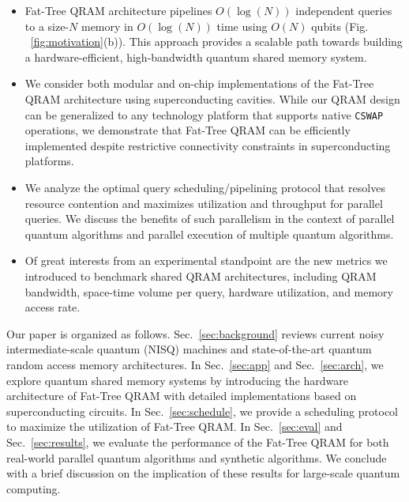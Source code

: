 \begin{itemize}
    \item Fat-Tree QRAM architecture pipelines $O(\log(N))$ independent queries to a size-$N$ memory in $O(\log(N))$ time using $O(N)$ qubits (Fig. ~\ref{fig:motivation}(b)). This approach provides a scalable path towards building a hardware-efficient, high-bandwidth quantum shared memory system. 
    \item We consider both modular and on-chip implementations of the Fat-Tree QRAM architecture using superconducting cavities. While our QRAM design can be generalized to any technology platform that supports native \texttt{CSWAP} operations, we demonstrate that Fat-Tree QRAM can be efficiently implemented despite restrictive connectivity constraints in superconducting platforms.
    \item We analyze the optimal query scheduling/pipelining protocol that resolves resource contention and maximizes utilization and throughput for parallel queries. We discuss the benefits of such parallelism in the context of parallel quantum algorithms and parallel execution of multiple quantum algorithms. 
    \item Of great interests from an experimental standpoint are the new metrics we introduced to benchmark shared QRAM architectures, including QRAM bandwidth, space-time volume per query, hardware utilization, and memory access rate. 
\end{itemize}

Our paper is organized as follows. Sec.~\ref{sec:background} reviews current noisy intermediate-scale quantum (NISQ) machines and state-of-the-art quantum random access memory architectures. In Sec.~\ref{sec:app} and Sec.~\ref{sec:arch}, we explore quantum shared memory systems by introducing the hardware architecture of Fat-Tree QRAM with detailed implementations based on superconducting circuits. In Sec.~\ref{sec:schedule}, we provide a scheduling protocol to maximize the utilization of Fat-Tree QRAM. In Sec.~\ref{sec:eval} and Sec.~\ref{sec:results}, we evaluate the performance of the Fat-Tree QRAM for both real-world parallel quantum algorithms and synthetic algorithms. We conclude with a brief discussion on the implication of these results for large-scale quantum computing.